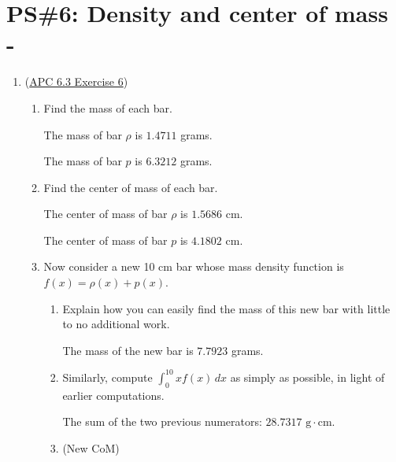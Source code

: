 


%


\allowdisplaybreaks
\section{PS\#6: Density and center of mass -  }

\everymath{\displaystyle}
\begin{enumerate}[leftmargin=0pt]

\item (\href{https://activecalculus.org/single/sec-6-3-mass.html#aQN}{APC 6.3 Exercise 6}) 
\begin{enumerate}
    \item Find the mass of each bar.
    
    \begin{red}
    The mass of bar $\rho$ is $1.4711$ grams.
    
    The mass of bar $p$ is $6.3212$ grams.
    \end{red}
    \item Find the center of mass of each bar.
    
    \begin{red}
    The center of mass of bar $\rho$ is $1.5686$ cm.
    
    The center of mass of bar $p$ is $4.1802$ cm.
    \end{red}
    \item Now consider a new 10 cm bar whose mass density function is $f(x) = \rho(x) + p(x)$.
    \begin{enumerate}
        \item Explain how you can easily find the mass of this new bar with little to no additional work.
        
        \begin{red}
        The mass of the new bar is $7.7923$ grams.
        \end{red}
        \item Similarly, compute $\int_0^{10} x f(x)\, dx$ as simply as possible, in light of earlier computations.
        
        \begin{red}
        The sum of the two previous numerators: $28.7317\text{ g} \cdot\text{cm}.$
        \end{red}

        \item (New CoM)


\end{enumerate}
\end{enumerate}
\end{enumerate}
